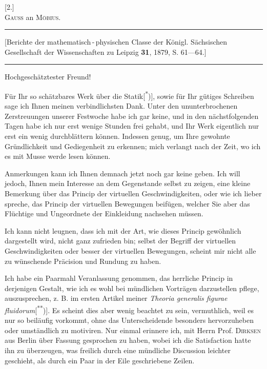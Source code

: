\clearpage\begingroup{}
\begin{center}
[2.]\\[.7em]
\textsc{Gauss} an \textsc{Möbius}.
\par\medskip\rule{\textwidth}{.35pt}\par
{\small [Berichte der mathematisch\,-\,physischen Classe der Königl. Sächsischen Gesellschaft der Wissenschaften zu Leipzig \textbf{31}, 1879, S. 61—64.]}\par
\rule{\textwidth}{.35pt}
\end{center}
\noindent\hspace*{.2\textwidth}Hochgeschätztester Freund!
\par\noindent\hspace*{\parindent}Für Ihr so schätzbares Werk über die Statik[\textsuperscript{*})]\begingroup\renewcommand{\thefootnote}{}\endgroup, sowie für Ihr gütiges
Schreiben sage ich Ihnen meinen verbindlichsten Dank. Unter den ununterbrochenen
Zerstreuungen unserer Festwoche habe ich gar keine, und in den
nächstfolgenden Tagen habe ich nur erst wenige Stunden frei gehabt, und
Ihr Werk eigentlich nur erst ein wenig durchblättern können. Indessen genug,
um Ihre gewohnte Gründlichkeit und Gediegenheit zu erkennen; mich
verlangt nach der Zeit, wo ich es mit Musse werde lesen können.

Anmerkungen  kann ich Ihnen demnach jetzt noch gar
keine geben. Ich will jedoch, Ihnen mein Interesse an dem Gegenstande
selbst zu zeigen, eine kleine Bemerkung über das Princip der virtuellen Geschwindigkeiten,
oder wie ich lieber spreche, das Princip der virtuellen Bewegungen
beifügen, welcher Sie aber das Flüchtige und Ungeordnete der
Einkleidung nachsehen müssen.

Ich kann nicht leugnen, dass ich mit der Art, wie dieses Princip gewöhnlich
dargestellt wird, nicht ganz zufrieden bin; selbst der Begriff der
virtuellen Geschwindigkeiten oder besser der virtuellen Bewegungen, scheint
mir nicht alle zu wünschende Präcision und Rundung zu haben.

Ich habe ein Paarmahl Veranlassung genommen, das herrliche Princip
in derjenigen Gestalt, wie ich es wohl bei mündlichen Vorträgen darzustellen
pflege, auszusprechen, z. B. im ersten Artikel meiner \textit{Theoria generalis figurae
fluidorum}[\textsuperscript{**})]\begingroup\renewcommand{\thefootnote}{}\endgroup. Es scheint dies aber wenig beachtet zu sein, vermuthlich, weil
es nur so beiläufig vorkommt, ohne das Unterscheidende besonders hervorzuheben
oder umständlich zu motiviren. Nur einmal erinnere ich, mit Herrn
Prof. \textsc{Dirksen} aus Berlin über  Fassung gesprochen zu haben, wobei
\clearpage{}
\noindent ich die Satisfaction hatte ihn zu überzeugen, was freilich durch eine mündliche
Discussion leichter geschieht, als durch ein Paar in der Eile geschriebene
Zeilen.

